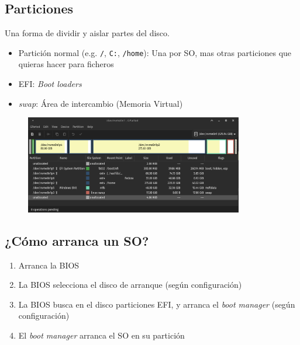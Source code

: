 \documentclass[aspectratio=43]{beamer}
\begin{document}
    \subsection{Particiones}
     \begin{frame}{\subsecname}{}
        Una forma de dividir y aislar partes del disco.
        \begin{itemize}
            \item Partición normal (e.g. \texttt{/}, \texttt{C:}, \texttt{/home}): Una por SO, mas otras particiones que quieras hacer para ficheros
            \item EFI: \textit{Boot loaders}
            \item \textit{swap}: Área de intercambio (Memoria Virtual)
        \end{itemize}
        \begin{figure}
            \centering
            \includegraphics[width=0.85\textwidth]{img/partitions.png}
        \end{figure}
    \end{frame}


    \subsection{¿Cómo arranca un SO?}
     \begin{frame}{\subsecname}{}
        \begin{enumerate}
            \item Arranca la BIOS
            \item La BIOS selecciona el disco de arranque (según configuración)
            \item La BIOS busca en el disco particiones EFI, y arranca el \textit{boot manager} (según configuración)
            \item El \textit{boot manager} arranca el SO en su partición
        \end{enumerate}
    \end{frame}
\end{document}
